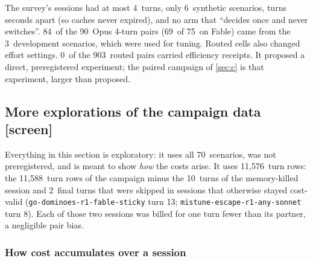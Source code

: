 \documentclass[11pt,letterpaper]{article}
\newcommand{\code}[1]{\texttt{#1}}
\newcommand{\screen}{\mbox{\textsf{\small\color{okgray}[screen]}}}
\newcommand{\NScenarios}{70}
\newcommand{\NTurns}{11{,}588}
\newcommand{\PerTurnNFmt}{11{,}576}
\newcommand{\RvKilledTurns}{10}
\newcommand{\RvNSkips}{2}
\newcommand{\RvSkipList}{\code{go-dominoes-r1-fable-sticky} turn 13; \code{mistune-escape-r1-any-sonnet} turn 8}
\newcommand{\CaDevScenarios}{3}
\newcommand{\CaFableFourDevPairs}{69}
\newcommand{\CaFableFourPairs}{75}
\newcommand{\CaOpusFourDevPairs}{84}
\newcommand{\CaOpusFourPairs}{90}
\newcommand{\CaReceipts}{0}
\newcommand{\CaRoutedPairs}{903}
\newcommand{\CaScenarios}{6}
\newcommand{\CaTurns}{4}
\begin{document}
\begin{caution}[title={Why a new experiment was needed}]
The survey's sessions had at most \CaTurns\ turns, only \CaScenarios\ synthetic scenarios, turns seconds apart
(so caches never expired), and no arm that ``decides once and never switches''. \CaOpusFourDevPairs\ of the \CaOpusFourPairs\ Opus \CaTurns-turn pairs (\CaFableFourDevPairs\ of
\CaFableFourPairs\ on Fable) came from the \CaDevScenarios\ development scenarios, which were used for tuning.
Routed cells also changed effort settings. \CaReceipts\ of the
\CaRoutedPairs\ routed pairs carried efficiency receipts. It proposed a direct, preregistered experiment; the paired
campaign of \cref{sec:c} is that experiment, larger than proposed.
\end{caution}
\subsection{More explorations of the campaign data \texorpdfstring{\screen}{[screen]}}\label{vt:sec:more}

Everything in this section is exploratory: it uses all \NScenarios\ scenarios, was not preregistered, and is
meant to show \emph{how} the costs arise. It uses \PerTurnNFmt\ turn rows: the \NTurns\ turn rows of the campaign minus the \RvKilledTurns\ turns of the
memory-killed session and \RvNSkips\ final turns that were skipped in sessions that otherwise stayed cost-valid
(\RvSkipList). Each of those two sessions was billed for one turn fewer than its partner, a negligible pair bias.

\subsubsection{How cost accumulates over a session}
\end{document}
